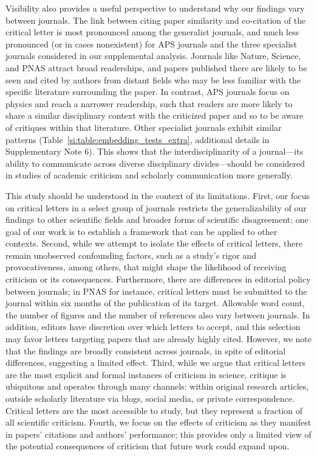 \documentclass[12pt,a4paper]{article}
\numberwithin{equation}{section}
\begin{document}
Visibility also provides a useful perspective to understand why our findings vary between journals.
The link between citing paper similarity and co-citation of the critical letter is most pronounced among the generalist journals, and much less pronounced (or in cases nonexistent) for APS journals and the three specialist journals considered in our supplemental analysis.
Journals like Nature, Science, and PNAS attract broad readerships, and papers published there are likely to be seen and cited by authors from distant fields who may be less familiar with the specific literature surrounding the paper.
In contrast, APS journals focus on physics and reach a narrower readership, such that readers are more likely to share a similar disciplinary context with the criticized paper and so to be aware of critiques within that literature.
Other specialist journals exhibit similar patterns (Table~\ref{si:table:embedding_tests_extra}, additional details in Supplementary Note 6).
This shows that the interdisciplinarity of a journal---its ability to communicate across diverse disciplinary divides---should be considered in studies of academic criticism and scholarly communication more generally.

This study should be understood in the context of its limitations.
First, our focus on critical letters in a select group of journals restricts the generalizability of our findings to other scientific fields and broader forms of scientific disagreement;
one goal of our work is to establish a framework that can be applied to other contexts. 
Second, while we attempt to isolate the effects of critical letters, there remain unobserved confounding factors, such as a study's rigor and provocativeness, among others, that might shape the likelihood of receiving criticism or its consequences. 
Furthermore, there are differences in editorial policy between journals; in PNAS for instance, critical letters must be submitted to the journal within six months of the publication of its target.
Allowable word count, the number of figures and the number of references also vary between journals.
In addition, editors have discretion over which letters to accept, and this selection may favor letters targeting papers that are already highly cited.
However, we note that the findings are broadly consistent across journals, in spite of editorial differences, suggesting a limited effect.
Third, while we argue that critical letters are the most explicit and formal instances of criticism in science, critique is ubiquitous and operates through many channels: within original research articles, outside scholarly literature via blogs, social media, or private correspondence.
Critical letters are the most accessible to study, but they represent a fraction of all scientific criticism.
Fourth, we focus on the effects of criticism as they manifest in papers' citations and authors' performance; 
this provides only a limited view of the potential consequences of criticism that future work could expand upon.
\end{document}
